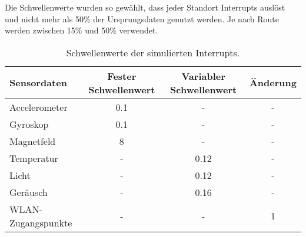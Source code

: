 Die Schwellenwerte wurden so gewählt, dass jeder Standort Interrupts auslöst und nicht mehr als 50\% der Ursprungsdaten genutzt werden.
Je nach Route werden zwischen 15\% und 50\% verwendet.
\begin{table}[h!]
    \centering
    \begin{tabular}{ | l | c | c | c | }
        \hline
        Sensordaten & Fester Schwellenwert & Variabler Schwellenwert & Änderung \\\hline
        Accelerometer & 0.1 & - & - \\\hline
        Gyroskop & 0.1 & - & - \\\hline
        Magnetfeld & 8 & - & - \\\hline
        Temperatur & - & 0.12 & - \\\hline
        Licht & - & 0.12 & - \\\hline
        Geräusch & - & 0.16 & - \\\hline
        WLAN-Zugangspunkte & - & - & 1 \\\hline
    \end{tabular}
    \caption{Schwellenwerte der simulierten Interrupts.}
    \label{tab:interrupt_values}
\end{table}

